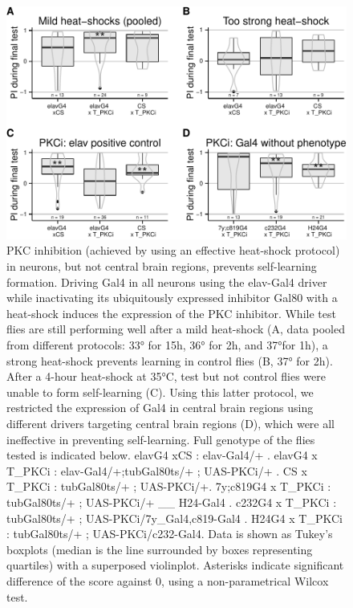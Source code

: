 \documentclass[]{article}
\begin{document}
\begin{figure}[htbp]
\centering
\includegraphics{firsttest_files/figure-latex/unnamed-chunk-3-1.pdf}
\caption{\label{fig:heatshock} PKC inhibition (achieved by using an
effective heat-shock protocol) in neurons, but not central brain
regions, prevents self-learning formation. Driving Gal4 in all neurons
using the elav-Gal4 driver while inactivating its ubiquitously expressed
inhibitor Gal80 with a heat-shock induces the expression of the PKC
inhibitor. While test flies are still performing well after a mild
heat-shock (A, data pooled from different protocols: 33° for 15h, 36°
for 2h, and 37°for 1h), a strong heat-shock prevents learning in control
flies (B, 37° for 2h). After a 4-hour heat-shock at 35°C, test but not
control flies were unable to form self-learning (C). Using this latter
protocol, we restricted the expression of Gal4 in central brain regions
using different drivers targeting central brain regions (D), which were
all ineffective in preventing self-learning. Full genotype of the flies
tested is indicated below. elavG4 xCS : elav-Gal4/+ . elavG4 x T\_PKCi :
elav-Gal4/+;tubGal80ts/+ ; UAS-PKCi/+ . CS x T\_PKCi : tubGal80ts/+ ;
UAS-PKCi/+. 7y;c819G4 x T\_PKCi : tubGal80ts/+ ; UAS-PKCi/+ \_\_
H24-Gal4 . c232G4 x T\_PKCi : tubGal80ts/+ ; UAS-PKCi/7y\_Gal4,c819-Gal4
. H24G4 x T\_PKCi : tubGal80ts/+ ; UAS-PKCi/c232-Gal4. Data is shown as
Tukey's boxplots (median is the line surrounded by boxes representing
quartiles) with a superposed violinplot. Asterisks indicate significant
difference of the score against 0, using a non-parametrical Wilcox
test.}
\end{figure}
\end{document}

